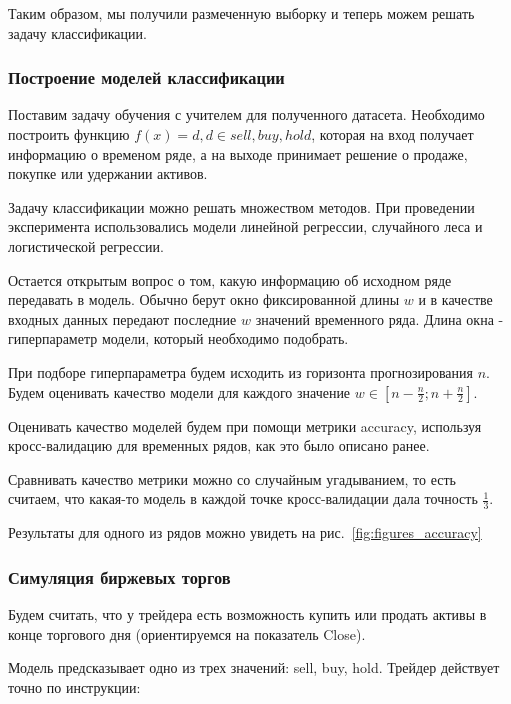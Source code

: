 \documentclass[a4paper,article,14pt]{extarticle}
\begin{document}


Таким образом, мы получили размеченную выборку и теперь можем решать задачу классификации.

\subsubsection{Построение моделей классификации}

Поставим задачу обучения с учителем для полученного датасета.
Необходимо построить функцию $f(x)=d, d \in {sell, buy, hold}$, которая на вход получает информацию о временом ряде, а на выходе принимает решение о продаже, покупке или удержании активов.

Задачу классификации можно решать множеством методов.
При проведении эксперимента использовались модели линейной регрессии, случайного леса и логистической регрессии.

Остается открытым вопрос о том, какую информацию об исходном ряде передавать в модель.
Обычно берут окно фиксированной длины $w$ и в качестве входных данных передают последние $w$ значений временного ряда.
Длина окна - гиперпараметр модели, который необходимо подобрать.

При подборе гиперпараметра будем исходить из горизонта прогнозирования $n$.
Будем оценивать качество модели для каждого значение $w \in \left[ n - \frac{n}{2}; n + \frac{n}{2} \right]$.

Оценивать качество моделей будем при помощи метрики accuracy, используя кросс-валидацию для временных рядов, как это было описано ранее.

Сравнивать качество метрики можно со случайным угадыванием, то есть считаем, что какая-то модель в каждой точке кросс-валидации дала точность $\frac{1}{3}$.

Результаты для одного из рядов можно увидеть на рис.~\ref{fig:figures_accuracy}


\subsubsection{Симуляция биржевых торгов}

Будем считать, что у трейдера есть возможность купить или продать активы в конце торгового дня (ориентируемся на показатель Close).

Модель предсказывает одно из трех значений: sell, buy, hold.
Трейдер действует точно по инструкции:
\end{document}
